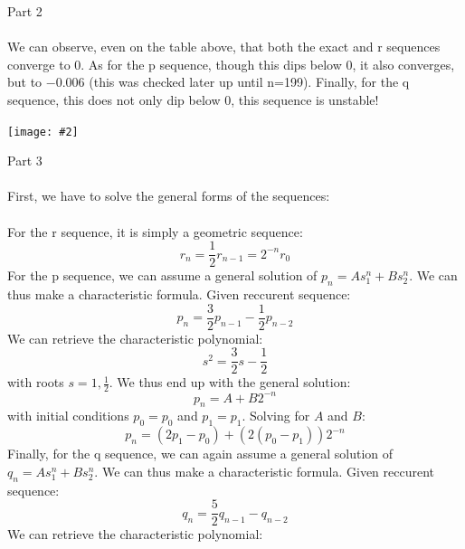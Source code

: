 \documentclass[10pt]{article} %
\newcommand{\centerfig}[2]{\begin{center}\texttt{[image: \#2]}\end{center}}
\begin{document}
\newpage
\noindent \large{Part 2}
\\ \\
\normalsize{We can observe, even on the table above, that both the exact and r sequences converge to 0. As for the p sequence, though this dips below $0$, it also converges, but to $-0.006$ (this was checked later up until n=199). Finally, for the q sequence, this does not only dip below $0$, this sequence is unstable!}
\centerfig{.7}{../figs/q1_error.png}
\newpage
\noindent \large{Part 3}
\\ \\
\normalsize{First, we have to solve the general forms of the sequences:}
\\ \\
\noindent For the r sequence, it is simply a geometric sequence:
\begin{equation}
	r_{n} = \frac{1}{2}r_{n-1} = 2^{-n}r_{0}
\end{equation}
\noindent For the p sequence, we can assume a general solution of $p_{n} = As^{n}_{1} + Bs^{n}_2$. We can thus make a characteristic formula. Given reccurent sequence:
\begin{equation}
	p_{n} = \frac{3}{2}p_{n-1} - \frac{1}{2}p_{n-2}
\end{equation}
\noindent We can retrieve the characteristic polynomial:
\begin{equation}
	s^{2} = \frac{3}{2}s - \frac{1}{2}
\end{equation}
with roots $s = 1, \frac{1}{2}$. We thus end up with the general solution: 
\begin{equation}
	p_{n} = A + B2^{-n}
\end{equation}
with initial conditions $p_0 = p_0$ and $p_1 = p_1$. Solving for $A$ and $B$:
\begin{equation}
	p_{n} = \left(2p_1 - p_0 \right) + \left( 2\left( p_0 - p_1 \right) \right)2^{-n}
\end{equation}
\noindent Finally, for the q sequence, we can again assume a general solution of $q_{n} = As^{n}_{1} + Bs^{n}_2$. We can thus make a characteristic formula. Given reccurent sequence:
\begin{equation}
	q_{n} = \frac{5}{2}q_{n-1} - q_{n-2}
\end{equation}
\noindent We can retrieve the characteristic polynomial:
\end{document}
